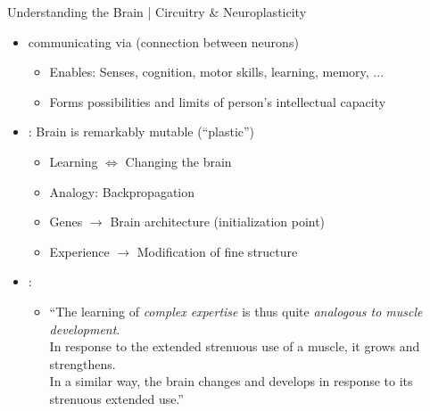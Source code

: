 \documentclass{ercisbeamer}
\begin{document}
\begin{frame}{Understanding the Brain | Circuitry \& Neuroplasticity}
    \begin{tbox}
        \begin{itemize}
            \item {} communicating via  (connection between neurons)
            \begin{itemize}
                \item Enables: Senses, cognition, motor skills, learning, memory, ...
                \item Forms possibilities and limits of person's intellectual capacity
            \end{itemize}
            \item {}: Brain is remarkably mutable (``plastic'')
            \begin{itemize}
                \item Learning $\Leftrightarrow$ Changing the brain
                \item Analogy: Backpropagation 
                \item Genes $\rightarrow$ Brain architecture (initialization point)
                \item Experience $\rightarrow$ Modification of fine structure
            \end{itemize}
        \end{itemize}
    \end{tbox}

    \begin{tbox}
        \begin{itemize}
            \item \citet{wieman12}: 
            \begin{itemize}
                \item ``The learning of \emph{complex expertise} is thus quite \emph{analogous to muscle development}. \\
                In response to the extended strenuous use of a muscle, it grows and strengthens. \\
                In a similar way, the brain changes and develops in response to its strenuous extended use.''
            \end{itemize}
        \end{itemize}
    \end{tbox}


\end{frame}
\end{document}

